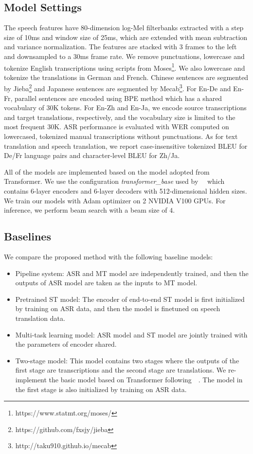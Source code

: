 \documentclass[letterpaper]{article} %
\begin{document}
\subsection{Model Settings}
The speech features have 80-dimension log-Mel filterbanks extracted with a step size of 10ms and window size of 25ms, which are extended with mean subtraction and variance normalization. The features are stacked with 3 frames to the left and downsampled to a 30ms frame rate. 
We remove punctuations, lowercase and tokenize  English transcriptions using scripts from Moses\footnote{https://www.statmt.org/moses/}. 
We also lowercase and tokenize the translations in German and French.
Chinese sentences are segmented by Jieba\footnote{https://github.com/fxsjy/jieba} and Japanese sentences are segmented by Mecab\footnote{http://taku910.github.io/mecab}. 
For En-De and En-Fr, parallel sentences are encoded using BPE method \cite{sennrich2015neural} which has a shared vocabulary of 30K tokens. For En-Zh and En-Ja, we encode source transcriptions and target translations, respectively, and the vocabulary size is limited to the most frequent 30K. 
ASR performance is evaluated with WER computed on lowercased, tokenized manual transcriptions without punctuations. As for text translation and speech translation, we report case-insensitive tokenized BLEU \cite{papineni2002bleu} for De/Fr language pairs and character-level BLEU for Zh/Ja.

All of the models are implemented based on the model adopted from Transformer. We use the configuration \textit{transformer\_base} used by~\citeauthor{vaswani2017attention}~ which contains 6-layer encoders and 6-layer decoders with 512-dimensional hidden sizes. 
We train our models with Adam optimizer \cite{kingma2014adam} on 2 NVIDIA V100 GPUs. For inference, we perform beam search with a beam size of $4$.

\subsection{Baselines}
We compare the proposed method with the following baseline models:
\begin{itemize}
	\item Pipeline system: ASR and MT model are independently trained, and then the outputs of ASR model are taken as the inputs to MT model.
	\item Pretrained ST model: The encoder of end-to-end ST model is first initialized by training on ASR data, and then the model is finetuned on speech translation data.
	\item Multi-task learning model: ASR model and ST model are jointly trained with the parameters of encoder shared.
	\item Two-stage model: This model contains two stages where the outputs of the first stage are transcriptions and the second stage are translations. We re-implement the basic model based on Transformer following~\citeauthor{sperber2019attention}~. The model in the first stage is also initialized by training on ASR data.
\end{itemize}
\end{document}
